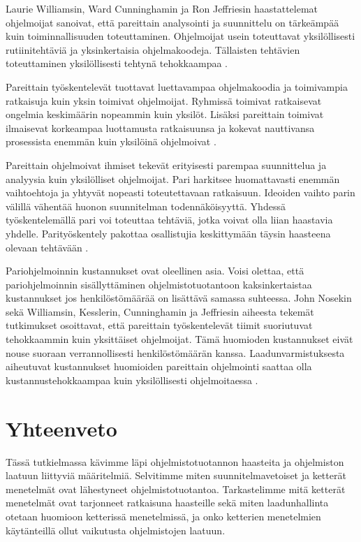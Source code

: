 \documentclass[finnish]{tktltiki2}
\theoremstyle{definition}
\theoremstyle{remark}
\begin{document}
Laurie Williamsin, Ward Cunninghamin ja Ron Jeffriesin haastattelemat ohjelmoijat sanoivat, että pareittain analysointi ja suunnittelu on tärkeämpää kuin toiminnallisuuden toteuttaminen. Ohjelmoijat usein toteuttavat yksilöllisesti rutiinitehtäviä ja yksinkertaisia ohjelmakoodeja. Tällaisten tehtävien toteuttaminen yksilöllisesti tehtynä tehokkaampaa \cite{WIL00}.

Pareittain työskentelevät tuottavat luettavampaa ohjelmakoodia ja toimivampia ratkaisuja kuin yksin toimivat ohjelmoijat. Ryhmissä toimivat ratkaisevat ongelmia keskimäärin nopeammin kuin yksilöt. Lisäksi pareittain toimivat ilmaisevat korkeampaa luottamusta ratkaisuunsa ja kokevat nauttivansa prosessista enemmän kuin yksilöinä ohjelmoivat \cite{NOS98}.

Pareittain ohjelmoivat ihmiset tekevät erityisesti parempaa suunnittelua ja analyysia kuin yksilölliset ohjelmoijat. Pari harkitsee huomattavasti enemmän vaihtoehtoja ja yhtyvät nopeasti toteutettavaan ratkaisuun. Ideoiden vaihto parin välillä vähentää huonon suunnitelman todennäköisyyttä. Yhdessä työskentelemällä pari voi toteuttaa tehtäviä, jotka voivat olla liian haastavia yhdelle. Parityöskentely pakottaa osallistujia keskittymään täysin haasteena olevaan tehtävään \cite{WIL00}.

Pariohjelmoinnin kustannukset ovat oleellinen asia. Voisi olettaa, että pariohjelmoinnin sisällyttäminen ohjelmistotuotantoon kaksinkertaistaa kustannukset jos henkilöstömäärää on lisättävä samassa suhteessa. John Nosekin \cite{NOS98} sekä Williamsin, Kesslerin, Cunninghamin ja Jeffriesin \cite{WIL00} aiheesta tekemät tutkimukset osoittavat, että pareittain työskentelevät tiimit suoriutuvat tehokkaammin kuin yksittäiset ohjelmoijat. Tämä huomioden kustannukset eivät nouse suoraan verrannollisesti henkilöstömäärän kanssa. Laadunvarmistuksesta aiheutuvat kustannukset huomioiden pareittain ohjelmointi saattaa olla kustannustehokkaampaa kuin yksilöllisesti ohjelmoitaessa \cite{COC00a}.

\section{Yhteenveto}

Tässä tutkielmassa kävimme läpi ohjelmistotuotannon haasteita ja ohjelmiston laatuun liittyviä määritelmiä. Selvitimme miten suunnitelmavetoiset ja ketterät menetelmät ovat lähestyneet ohjelmistotuotantoa. Tarkastelimme mitä ketterät menetelmät ovat tarjonneet ratkaisuna haasteille sekä miten laadunhallinta otetaan huomioon ketterissä menetelmissä, ja onko ketterien menetelmien käytänteillä ollut vaikutusta ohjelmistojen laatuun. 
\end{document}
